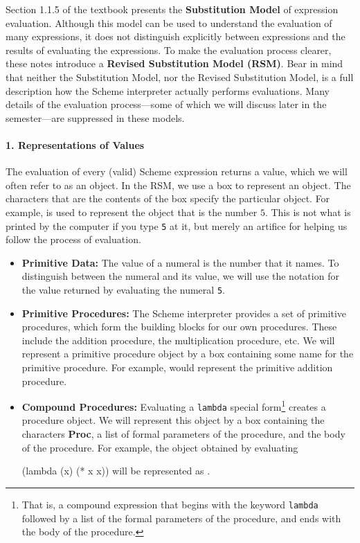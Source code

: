 




\medskip
 
Section 1.1.5 of the textbook presents the {\bf Substitution Model} 
of expression evaluation. Although this model can be used to understand the
evaluation of many expressions, it does not distinguish explicitly 
between expressions and the results of evaluating the expressions. To make
the evaluation process clearer, these notes introduce a 
{\bf Revised Substitution Model (RSM)}. Bear in mind that neither 
the Substitution Model, nor the Revised Substitution Model, 
is a full description how the Scheme interpreter actually performs 
evaluations. Many details of the evaluation process---some of 
which we will discuss later in the semester---are suppressed in 
these models.

\paragraph{1. Representations of Values}

The evaluation of every (valid) Scheme expression returns a value,
which we will often refer to as an object. In the RSM, we use a box
to represent an object. The characters that are the contents of the
box specify the particular object. For example,  is used to
represent the object that is the number $5$. This is not what is
printed by the computer if you type {\tt 5} at it, but merely an artifice
for helping us follow the process of evaluation.

\begin{itemize} 

\item {\bf Primitive Data:} The value of a numeral is the number that
it names. To distinguish between the numeral and its value, we will
use the notation  for the value returned by evaluating the
numeral {\tt 5}. 

\item {\bf Primitive Procedures:} The Scheme interpreter provides a
set of primitive procedures, which form the building blocks for our
own procedures. These include the addition procedure, the
multiplication procedure, etc. We will represent a primitive
procedure object by a box containing some name for the primitive
procedure. For example,  would represent the 
primitive addition procedure.

\item {\bf Compound Procedures:} 
Evaluating a {\tt lambda} special form\footnote{That is, a compound
expression that begins with the keyword {\tt lambda} followed by a
list of the formal parameters of the procedure, and ends with
the body of the procedure.} creates a procedure object. We will represent
this object by a box containing the characters {\bf Proc}, a list of
formal parameters of the procedure, and the body of the procedure.
For example, the object obtained by evaluating

\beginlisp
(lambda (x) (* x x))
\endlisp
will be  represented as .
\end{itemize} 

